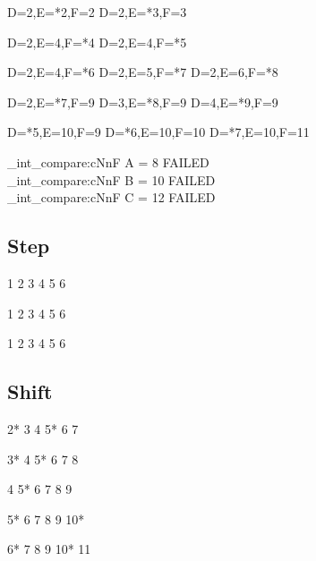 \begin{CDRBlock} [
  tags={E,F},
]
D=2,E=*2,F=2
D=2,E=*3,F=3
\end{CDRBlock}

\begin{CDRBlock} [
  tags=F,
]
D=2,E=4,F=*4
D=2,E=4,F=*5
\end{CDRBlock}

\begin{CDRBlock} [
  tags={F, E},
]
D=2,E=4,F=*6
D=2,E=5,F=*7
D=2,E=6,F=*8
\end{CDRBlock}

\begin{CDRBlock} [
  tags={E, D},
]
D=2,E=*7,F=9
D=3,E=*8,F=9
D=4,E=*9,F=9
\end{CDRBlock}
\begin{CDRBlock} [
  tags={D,F},
]
D=*5,E=10,F=9
D=*6,E=10,F=10
D=*7,E=10,F=11
\end{CDRBlock}

\ExplSyntaxOn
\CDR_int_compare:cNnF { A } = 8 { FAILED \\ }
\CDR_int_compare:cNnF { B } = {10} { FAILED \\ }
\CDR_int_compare:cNnF { C } = {12} { FAILED \\ }
\ExplSyntaxOff

\egroup

\subsection{Step}
\bgroup
\def\CDRNumberOther#1{\textcolor{magenta!25!white}{#1}\hspace{5mm}}
\begin{CDRBlock}[stepnumber=1]
1
2
3
4
5
6
\end{CDRBlock}
\begin{CDRBlock}[stepnumber=2]
1
2
3
4
5
6
\end{CDRBlock}
\begin{CDRBlock}[stepnumber=5]
1
2
3
4
5
6
\end{CDRBlock}
\subsection{Shift}
\begin{CDRBlock}[stepnumber=5,firstnumber=2]
2*
3
4
5*
6
7
\end{CDRBlock}
\begin{CDRBlock}[stepnumber=5,firstnumber=3]
3*
4
5*
6
7
8
\end{CDRBlock}
\begin{CDRBlock}[stepnumber=5,firstnumber=4]
4
5*
6
7
8
9
\end{CDRBlock}
\begin{CDRBlock}[stepnumber=5,firstnumber=5]
5*
6
7
8
9
10*
\end{CDRBlock}
\begin{CDRBlock}[stepnumber=5,firstnumber=6]
6*
7
8
9
10*
11
\end{CDRBlock}

